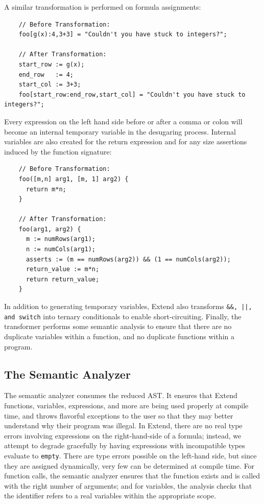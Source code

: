   \medskip \noindent
  A similar transformation is performed on formula assignments:
  \begin{lstlisting}
    // Before Transformation:
    foo[g(x):4,3+3] = "Couldn't you have stuck to integers?";

    // After Transformation:
    start_row := g(x);
    end_row   := 4;
    start_col := 3+3;
    foo[start_row:end_row,start_col] = "Couldn't you have stuck to integers?";
  \end{lstlisting}
  \medskip \noindent
  Every expression on the left hand side before or after a comma or colon will become an internal temporary variable in the desugaring process. Internal variables are also created for the return expression and for any size assertions induced by the function signature:
  \begin{lstlisting}
    // Before Transformation:
    foo([m,n] arg1, [m, 1] arg2) {
      return m*n;
    }

    // After Transformation:
    foo(arg1, arg2) {
      m := numRows(arg1);
      n := numCols(arg1);
      asserts := (m == numRows(arg2)) && (1 == numCols(arg2));
      return_value := m*n;
      return return_value;
    }
  \end{lstlisting}
  In addition to generating temporary variables, Extend also transforms \texttt{\&\&, ||, and switch} into ternary conditionals to enable short-circuiting. Finally, the transformer performs some semantic analysis to ensure that there are no duplicate variables within a function, and no duplicate functions within a program.

  \subsection{The Semantic Analyzer}
  The semantic analyzer consumes the reduced AST. It ensures that Extend functions, variables, expressions, and more are being used properly at compile time, and throws flavorful exceptions to the user so that they may better understand why their program was illegal. In Extend, there are no real type errors involving expressions on the right-hand-side of a formula; instead, we attempt to degrade gracefully by having expressions with incompatible types evaluate to \texttt{empty}. There are type errors possible on the left-hand side, but since they are assigned dynamically, very few can be determined at compile time. For function calls, the semantic analyzer ensures that the function exists and is called with the right number of arguments; and for variables, the analysis checks that the identifier refers to a real variables within the appropriate scope.

